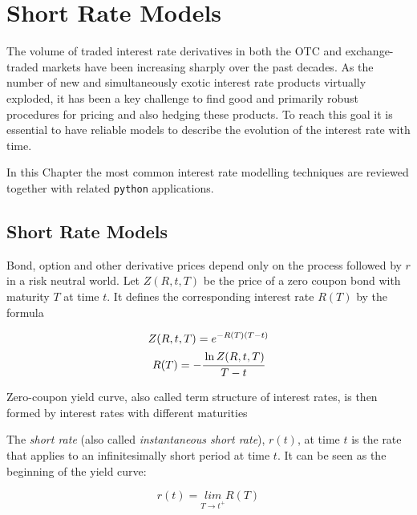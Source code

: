 \chapter{Short Rate Models}

The volume of traded interest rate derivatives in both the OTC and exchange-traded markets have been increasing sharply over the past decades. As the number of new and simultaneously exotic interest rate products virtually exploded, it has been a key challenge to find good and primarily robust procedures for pricing and also hedging these products. To reach this goal it is essential to have reliable models to describe the evolution of the interest rate with time.

In this Chapter the most common interest rate modelling techniques are reviewed together with related \texttt{python} applications.

\section{Short Rate Models}
Bond, option and other derivative prices depend only on the process followed by $r$ in a risk neutral world.
Let $Z(R, t, T)$ be the price of a zero coupon bond with maturity $T$ at time $t$. It defines the corresponding interest rate $R(T)$ by the formula

\begin{equation}
\begin{gathered}
Z(R, t, T) = e^{-R(T)(T-t)} \\
R(T) = -\cfrac{\ln Z(R, t, T)}{T-t}
\end{gathered}
\label{eq:zcb}
\end{equation}

Zero-coupon yield curve, also called term structure of interest rates, is then formed by interest rates with different maturities

The \emph{short rate} (also called \emph{instantaneous short rate}), $r(t)$, at time $t$ is the rate that applies to an infinitesimally short period at time $t$. It can be seen as the beginning of the yield curve: 

\begin{equation}
r(t) = \underset{T\rightarrow t^{+}}{lim}R(T)
\label{eq:short_rate}
\end{equation}

%
%
%

